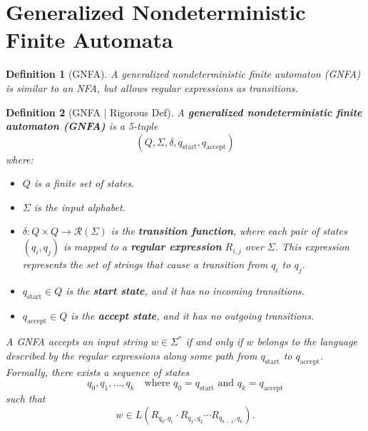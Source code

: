 \documentclass[12pt]{article}
\newtheorem{definition}{Definition}
\begin{document}
\section*{Generalized Nondeterministic Finite Automata} 
\begin{definition}[GNFA]
    A generalized nondeterministic finite automaton (GNFA) is similar to an NFA, 
    but allows regular expressions as transitions.
\end{definition}
\begin{definition}[GNFA | Rigorous Def]
    A \textbf{generalized nondeterministic finite automaton (GNFA)} is a 5-tuple
    \[
        (Q, \Sigma, \delta, q_{\text{start}}, q_{\text{accept}})
    \]
    where:
    \begin{itemize}
        \item \( Q \) is a finite set of states.
        \item \( \Sigma \) is the input alphabet.
        \item \( \delta: Q \times Q \to \mathcal{R}(\Sigma) \) is the 
            \textbf{transition function}, where each pair of states \( (q_i, q_j) \) 
            is mapped to a \textbf{regular expression} \( R_{i,j} \) over \( \Sigma \). 
            This expression represents the set of strings that cause a transition from \( q_i \) 
            to \( q_j \).
        \item \( q_{\text{start}} \in Q \) is the \textbf{start state}, 
            and it has no incoming transitions.
        \item \( q_{\text{accept}} \in Q \) is the \textbf{accept state}, 
            and it has no outgoing transitions.
    \end{itemize}
    
    \noindent 
    A GNFA accepts an input string \( w \in \Sigma^* \) if and only if \( w \) belongs to 
    the language described by the regular expressions along some path from 
    \( q_{\text{start}} \) to \( q_{\text{accept}} \). Formally, there exists a 
    sequence of states 
    \[
        q_0, q_1, \dots, q_k \quad \text{where } q_0 = q_{\text{start}} \text{ and } 
        q_k = q_{\text{accept}}
    \]
    such that
    \[
        w \in L(R_{q_0, q_1} \cdot R_{q_1, q_2} \cdots R_{q_{k-1}, q_k}).
    \]
\end{definition}
\end{document}

